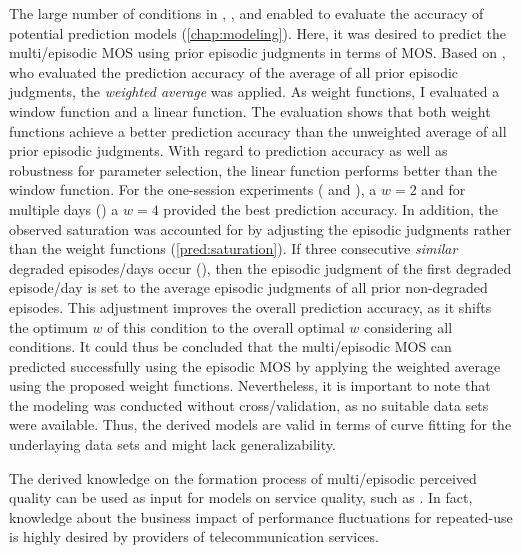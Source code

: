 The large number of conditions in , \EIIa{}, and  enabled to evaluate the accuracy of potential prediction models (\autoref{chap:modeling}).
Here, it was desired to predict the multi\-/episodic \ac{MOS} using prior episodic judgments in terms of \ac{MOS}.
Based on \citet{moller_single-call_2011}, who evaluated the prediction accuracy of the average of all prior episodic judgments, the \emph{weighted average} was applied.
As weight functions, I evaluated a window function and a linear function.
The evaluation shows that both weight functions achieve a better prediction accuracy than the unweighted average of all prior episodic judgments.
With regard to prediction accuracy as well as robustness for parameter selection, the linear function performs better than the window function.
For the one-session experiments ( and \EIIa{}), a $\mathit{w}=2$ and for multiple days () a $\mathit{w}=4$ provided the best prediction accuracy.
In addition, the observed saturation was accounted for by adjusting the episodic judgments rather than the weight functions (\autoref{pred:saturation}).
If three consecutive \emph{similar} degraded episodes/days occur (), then the episodic judgment of the first degraded episode/day is set to the average episodic judgments of all prior non-degraded episodes.
This adjustment improves the overall prediction accuracy, as it shifts the optimum $\mathit{w}$ of this condition to the overall optimal $\mathit{w}$ considering all conditions.
It could thus be concluded that the multi\-/episodic \ac{MOS} can predicted successfully using the episodic \ac{MOS} by applying the weighted average using the proposed weight functions.
Nevertheless, it is important to note that the modeling was conducted without cross\-/validation, as no suitable data sets were available.
Thus, the derived models are valid in terms of curve fitting for the underlaying data sets and might lack generalizability.

The derived knowledge on the formation process of multi\-/episodic perceived quality can be used as input for models on service quality, such as \citet{parasuraman_conceptual_1985}.
In fact, knowledge about the business impact of performance fluctuations for repeated-use is highly desired by providers of telecommunication services.


